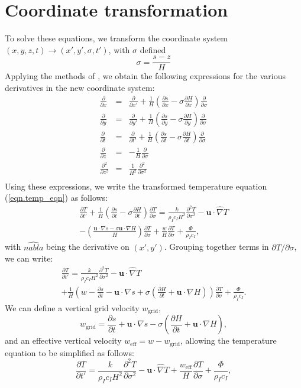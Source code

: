 \documentclass[10pt,english,a4paper]{article}
\newcommand{\diffn}[2]{\ensuremath{\frac{\partial #1}{\partial #2}}}
\newcommand{\diffnsq}[2]{\ensuremath{\frac{\partial^2 #1}{\partial #2^2}}}
\begin{document}
\section{Coordinate transformation}
%
To solve these equations, we transform the coordinate system
$(x,y,z,t)\rightarrow (x',y',\sigma,t')$, with $\sigma$ defined
%
\begin{equation}
\sigma = \frac{s-z}{H}
\label{eqn.defn_sigma}
\end{equation}
%
Applying the methods of \citet{Hindmarsh1988}, we obtain the following
expressions for the various derivatives in the new coordinate system:
%
\begin{eqnarray}
\diffn{}{x} &=& \diffn{}{x'}+\frac{1}{H}\left(\diffn{s}{x}-\sigma\diffn{H}{x}\right)\diffn{}{\sigma}\\
\diffn{}{y} &=& \diffn{}{y'}+\frac{1}{H}\left(\diffn{s}{y}-\sigma\diffn{H}{y}\right)\diffn{}{\sigma}\\
\diffn{}{t} &=& \diffn{}{t'}+\frac{1}{H}\left(\diffn{s}{t}-\sigma\diffn{H}{t}\right)\diffn{}{\sigma}\\
\diffn{}{z} &=& -\frac{1}{H}\diffn{}{\sigma}\\
\diffnsq{}{z} &=& \frac{1}{H^2}\diffnsq{}{\sigma}\\
\end{eqnarray}
%
Using these expressions, we write the transformed temperature equation
(\ref{eqn.temp_eqn}) as follows:
%
\begin{multline}
\diffn{T}{t'}+\frac{1}{H}\left(\diffn{s}{t}-\sigma\diffn{H}{t}\right)\diffn{T}{\sigma}
= \frac{k}{\rho_I c_I H^2}\diffnsq{T}{\sigma} -
\mathbf{u}\cdot\hat{\nabla}T\\ 
- \left(\frac{\mathbf{u}\cdot \nabla s
  -\sigma \mathbf{u}\cdot\nabla H}{H}\right)\diffn{T}{\sigma} +\frac{w}{H}\diffn{T}{\sigma}+\frac{\Phi}{\rho_I c_I},
\end{multline}
%
with $\hat{nabla}$ being the derivative on $(x',y')$. Grouping
together terms in $\partial T/\partial \sigma$, we can write:
%
\begin{multline}
\diffn{T}{t'} = \frac{k}{\rho_I c_I H^2}\diffnsq{T}{\sigma} -
\mathbf{u}\cdot\hat{\nabla}T\\
+\frac{1}{H}\left(w-\diffn{s}{t}-\mathbf{u}\cdot \nabla s + \sigma
\left( \diffn{H}{t} +\mathbf{u}\cdot\nabla H \right) \right)\diffn{T}{\sigma}+\frac{\Phi}{\rho_I c_I}.
\end{multline}
%
We can define a vertical grid velocity $w_{\mathrm{grid}}$,
%
\begin{equation}
w_{\mathrm{grid}}=\diffn{s}{t}+\mathbf{u}\cdot \nabla s - \sigma
\left( \diffn{H}{t} +\mathbf{u}\cdot\nabla H \right),
\end{equation}
%
and an effective vertical velocity $w_{\mathrm{eff}}=w-w_{\mathrm{grid}}$, allowing the temperature equation to be simplified as follows:
%
\begin{equation}
\frac{\partial T}{\partial t'} = \frac{k}{\rho_I c_I
  H^2}\frac{\partial^2 T}{\partial \sigma^2}
  - \mathbf{u}\cdot\hat{\nabla}T
  + \frac{w_{\mathrm{eff}}}{H}\frac{\partial T}{\partial
  \sigma}+\frac{\Phi}{\rho_I c_I}, 
\end{equation}
%
\end{document}

